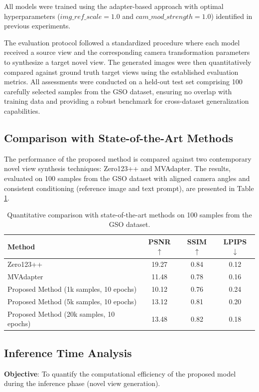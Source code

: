 All models were trained using the adapter-based approach with optimal hyperparameters ($img\_ref\_scale=1.0$ and $cam\_mod\_strength=1.0$) identified in previous experiments.

The evaluation protocol followed a standardized procedure where each model received a source view and the corresponding camera transformation parameters to synthesize a target novel view. The generated images were then quantitatively compared against ground truth target views using the established evaluation metrics. All assessments were conducted on a held-out test set comprising 100 carefully selected samples from the GSO dataset, ensuring no overlap with training data and providing a robust benchmark for cross-dataset generalization capabilities.

\subsection{Comparison with State-of-the-Art Methods}\label{ssec:exp_sota_comparison}
The performance of the proposed method is compared against two contemporary novel view synthesis techniques: Zero123++ and MVAdapter. The results, evaluated on 100 samples from the GSO dataset with aligned camera angles and consistent conditioning (reference image and text prompt), are presented in Table \ref{tab:sota_comparison_gso}.

\begin{table}[htbp]
  \centering
  \caption{Quantitative comparison with state-of-the-art methods on 100 samples from the GSO dataset.}
  \label{tab:sota_comparison_gso}
  \begin{tabular}{lccc}
    \toprule
    \textbf{Method} & \textbf{PSNR} $\uparrow$ & \textbf{SSIM} $\uparrow$ & \textbf{LPIPS} $\downarrow$ \\
    \midrule
    Zero123++ \cite{zero1to3} & 19.27 & 0.84 & 0.12 \\
    MVAdapter \cite{mvadapter} & 11.48 & 0.78 & 0.16 \\
    Proposed Method (1k samples, 10 epochs) & 10.12 & 0.76 & 0.24 \\
    Proposed Method (5k samples, 10 epochs) & 13.12 & 0.81 & 0.20 \\
    Proposed Method (20k samples, 10 epochs) & 13.48 & 0.82 & 0.18 \\
    \bottomrule
  \end{tabular}
\end{table}


\subsection{Inference Time Analysis}\label{ssec:exp_inference_time}
\textbf{Objective}: To quantify the computational efficiency of the proposed model during the inference phase (novel view generation).

